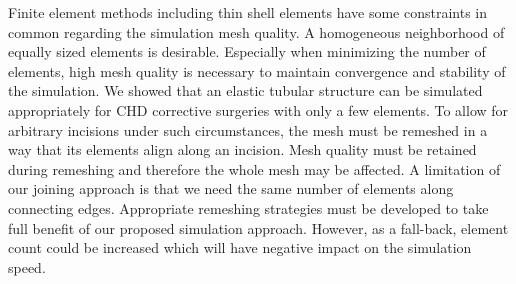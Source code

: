 Finite element methods including thin shell elements have some constraints in common regarding the simulation mesh quality. A homogeneous neighborhood of equally sized elements is desirable. Especially when minimizing the number of elements, high mesh quality is necessary to maintain convergence and stability of the simulation. We showed that an elastic tubular structure can be simulated appropriately for CHD corrective surgeries with only a few elements. To allow for arbitrary incisions under such circumstances, the mesh must be remeshed in a way that its elements align along an incision. Mesh quality must be retained during remeshing and therefore the whole mesh may be affected. A limitation of our joining approach is that we need the same number of elements along connecting edges. Appropriate remeshing strategies must be developed to take full benefit of our proposed simulation approach. However, as a fall-back, element count could be increased which will have negative impact on the simulation speed.

